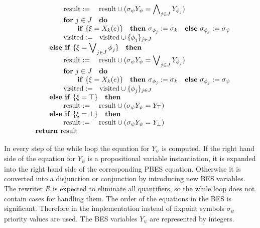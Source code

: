 \documentclass{article}
\begin{document}
{\begin{equation*}
\begin{array}{l}
\qquad \qquad \text{result}:=\text{ result}\cup (\sigma _{\psi }Y_{\psi
}=\dbigwedge_{j\in J}Y_{\phi _{j}}) \\
\qquad \qquad \text{\textbf{for} }j\in J\text{ \textbf{do}} \\
\qquad \qquad \qquad \text{\textbf{if} }\{\xi =X_{k}(e)\}\text{ \textbf{then}
}\sigma _{\phi _{j}}:=\sigma _{k}\text{ \textbf{else} }\sigma _{\phi
_{j}}:=\sigma _{\psi } \\
\qquad \qquad \text{visited}:=\text{visited}\cup \{\phi _{j}\}_{j\in J} \\
\qquad \text{\textbf{else if} }\{\xi =\dbigvee_{j\in J}\phi _{j}\}\text{
\textbf{then}} \\
\qquad \qquad \text{result}:=\text{ result}\cup (\sigma _{\psi }Y_{\psi
}=\dbigvee_{j\in J}Y_{\phi _{j}}) \\
\qquad \qquad \text{\textbf{for} }j\in J\text{ \textbf{do}} \\
\qquad \qquad \qquad \text{\textbf{if} }\{\xi =X_{k}(e)\}\text{ \textbf{then}
}\sigma _{\phi _{j}}:=\sigma _{k}\text{ \textbf{else} }\sigma _{\phi
_{j}}:=\sigma _{\psi } \\
\qquad \qquad \text{visited}:=\text{visited}\cup \{\phi _{j}\}_{j\in J} \\
\qquad \text{\textbf{else if} }\{\xi =\top \}\text{ \textbf{then}} \\
\qquad \qquad \text{result}:=\text{ result}\cup (\sigma _{\psi }Y_{\psi
}=Y_{\top }) \\
\qquad \text{\textbf{else if} }\{\xi =\bot \}\text{ \textbf{then}} \\
\qquad \qquad \text{result}:=\text{ result}\cup (\sigma _{\psi }Y_{\psi
}=Y_{\bot }) \\
\text{\textbf{return }result}%
\end{array}%
\end{equation*}%
}

In every step of the while loop the equation for $Y_{\psi }$ is computed. If
the right hand side of the equation for $Y_{\psi }$ is a propositional
variable instantiation, it is expanded into the right hand side of the
corresponding PBES equation. Otherwise it is converted into a disjunction or
conjunction by introducing new BES variables. The rewriter $R$ is expected
to eliminate all quantifiers, so the while loop does not contain cases for
handling them. The order of the equations in the BES is significant.
Therefore in the implementation instead of fixpoint symbols $\sigma _{\psi }$
priority values are used. The BES variables $Y_{\psi }$ are represented by
integers.
\end{document}
